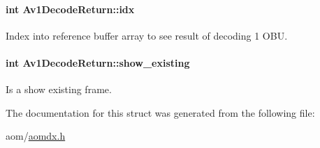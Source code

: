 \paragraph[{\texorpdfstring{idx}{idx}}]{\setlength{\rightskip}{0pt plus 5cm}int Av1\+Decode\+Return\+::idx}\hypertarget{structAv1DecodeReturn_aeefcb8b1f412902428fa86ea066e4414}{}\label{structAv1DecodeReturn_aeefcb8b1f412902428fa86ea066e4414}
Index into reference buffer array to see result of decoding 1 O\+BU. 
\paragraph[{\texorpdfstring{show\+\_\+existing}{show_existing}}]{\setlength{\rightskip}{0pt plus 5cm}int Av1\+Decode\+Return\+::show\+\_\+existing}\hypertarget{structAv1DecodeReturn_ac95f1cc492f7bb172dc1d9132674c3ec}{}\label{structAv1DecodeReturn_ac95f1cc492f7bb172dc1d9132674c3ec}
Is a show existing frame. 

The documentation for this struct was generated from the following file\+:\begin{DoxyCompactItemize}
\item 
aom/\hyperlink{aomdx_8h}{aomdx.\+h}\end{DoxyCompactItemize}
